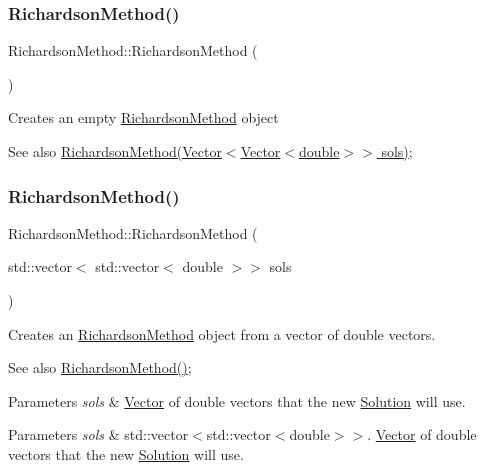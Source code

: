 \subsubsection{\texorpdfstring{Richardson\+Method()}{RichardsonMethod()}\hspace{0.1cm}{\footnotesize\ttfamily [1/2]}}
{\footnotesize\ttfamily Richardson\+Method\+::\+Richardson\+Method (\begin{DoxyParamCaption}{ }\end{DoxyParamCaption})}

Creates an empty \hyperlink{class_richardson_method}{Richardson\+Method} object \begin{DoxySeeAlso}{See also}
\hyperlink{class_richardson_method}{Richardson\+Method(\+Vector$<$\+Vector$<$double$>$$>$ sols)}; 
\end{DoxySeeAlso}
\mbox{\label{class_richardson_method_a11cf699f84bdd051e16983096c6d4979}} 
\subsubsection{\texorpdfstring{Richardson\+Method()}{RichardsonMethod()}\hspace{0.1cm}{\footnotesize\ttfamily [2/2]}}
{\footnotesize\ttfamily Richardson\+Method\+::\+Richardson\+Method (\begin{DoxyParamCaption}\item[{std\+::vector$<$ std\+::vector$<$ double $>$$>$}]{sols }\end{DoxyParamCaption})}

Creates an \hyperlink{class_richardson_method}{Richardson\+Method} object from a vector of double vectors. \begin{DoxySeeAlso}{See also}
\hyperlink{class_richardson_method_a01c839ad5a09cd0e0a9e56ad8e43f980}{Richardson\+Method()}; 
\end{DoxySeeAlso}

\begin{DoxyParams}{Parameters}
{\em sols} & \hyperlink{class_vector}{Vector} of double vectors that the new \hyperlink{class_solution}{Solution} will use. \\
\hline
\end{DoxyParams}

\begin{DoxyParams}{Parameters}
{\em sols} & std\+::vector$<$std\+::vector$<$double$>$$>$. \hyperlink{class_vector}{Vector} of double vectors that the new \hyperlink{class_solution}{Solution} will use. \\
\hline
\end{DoxyParams}


